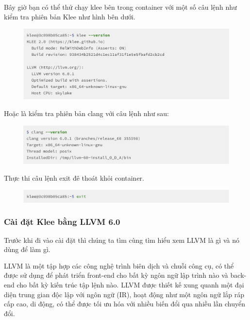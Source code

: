 \documentclass[12pt,a4paper]{article}
\begin{document}
Bây giờ bạn có thể thử chạy klee bên trong container với một số câu lệnh  như kiểm tra phiên bản Klee như hình bên dưới.

\begin{figure}[ht]
\begin{center}
\includegraphics[scale=.3]{hinhanh/kleeversion.png}
\end{center}
\end{figure}

Hoặc là kiểm tra phiên bản clang với câu lệnh như sau: 

\begin{figure}[ht]
\begin{center}
\includegraphics[scale=.3]{hinhanh/clangversion.png}
\end{center}
\end{figure}

Thực thi câu lệnh exit đê thoát khỏi container.

\begin{figure}[ht]
\begin{center}
\includegraphics[scale=.3]{hinhanh/exitcontainer.png}
\end{center}
\end{figure}

\subsubsection{Cài đặt Klee bằng LLVM 6.0}

Trước khi đi vào cài đặt thì chúng ta tìm cùng tìm hiểu xem LLVM là gì và nó dùng để làm gì.

LLVM là một tập hợp các công nghệ trình biên dịch và chuỗi công cụ, có thể được sử dụng để phát triển front-end cho bất kỳ ngôn ngữ lập trình nào và back-end cho bất kỳ kiến trúc tập lệnh nào. LLVM được thiết kế xung quanh một đại diện trung gian độc lập với ngôn ngữ (IR), hoạt động như một ngôn ngữ lắp ráp cấp cao, di động, có thể được tối ưu hóa với nhiều biến đổi qua nhiều lần chuyển đổi.
\end{document}
